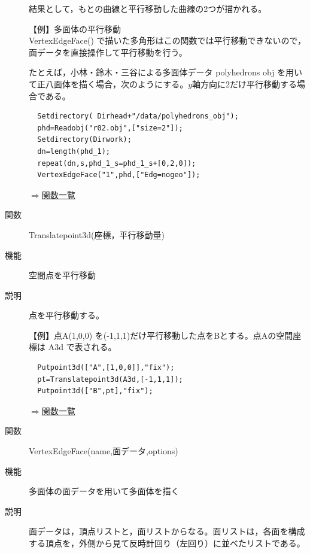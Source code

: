 \documentclass[papersize,a4paper,12pt,uplatex]{jsarticle}
\begin{document}
\begin{description}
結果として，もとの曲線と平行移動した曲線の2つが描かれる。

\vspace{\baselineskip}
【例】多面体の平行移動\\
VertexEdgeFace() で描いた多角形はこの関数では平行移動できないので，面データを直接操作して平行移動を行う。
  
たとえば，小林・鈴木・三谷による多面体データ  polyhedrons obj  を用いて正八面体を描く場合，次のようにする。$y$軸方向に2だけ平行移動する場合である。

\begin{verbatim}
  Setdirectory( Dirhead+"/data/polyhedrons_obj");
  phd=Readobj("r02.obj",["size=2"]);
  Setdirectory(Dirwork);
  dn=length(phd_1);
  repeat(dn,s,phd_1_s=phd_1_s+[0,2,0]);
  VertexEdgeFace("1",phd,["Edg=nogeo"]);
\end{verbatim}
      \begin{center}  \end{center}

\begin{flushright} \hyperlink{functionlist}{$\Rightarrow$関数一覧}\end{flushright}

\hypertarget{translatepoint3d}{}
\item[関数]  Translatepoint3d(座標，平行移動量)
\item[機能]  空間点を平行移動
\item[説明]  点を平行移動する。

\vspace{\baselineskip}
【例】点A(1,0,0) を(-1,1,1)だけ平行移動した点をBとする。点Aの空間座標は A3d で表される。 
\begin{verbatim}
  Putpoint3d(["A",[1,0,0]],"fix");
  pt=Translatepoint3d(A3d,[-1,1,1]);
  Putpoint3d(["B",pt],"fix");
\end{verbatim}
\vspace{\baselineskip}
\begin{flushright} \hyperlink{functionlist}{$\Rightarrow$関数一覧}\end{flushright}

\hypertarget{vertexedgeface}{}
\item[関数]  VertexEdgeFace(name,面データ,options)
\item[機能]  多面体の面データを用いて多面体を描く
\item[説明]  面データは，頂点リストと，面リストからなる。面リストは，各面を構成する頂点を，外側から見て反時計回り（左回り）に並べたリストである。


\end{description}
\end{document}
